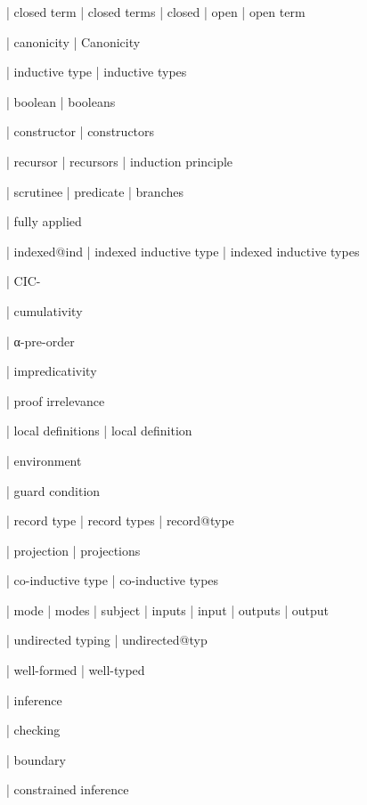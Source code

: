   | closed term
  | closed terms
  | closed
  | open
  | open term

  | canonicity
  | Canonicity

  | inductive type
  | inductive types

  | boolean
  | booleans

  | constructor
  | constructors

  | recursor
  | recursors
  | induction principle

  | scrutinee
  | predicate
  | branches

  | fully applied

  | indexed@ind
  | indexed inductive type
  | indexed inductive types

  | CIC-

  | cumulativity

  | α-pre-order

  | impredicativity

  | proof irrelevance

  | local definitions
  | local definition

  | environment

  | guard condition

  | record type
  | record types
  | record@type

  | projection
  | projections

  | co-inductive type
  | co-inductive types


  | mode
  | modes
  | subject
  | inputs
  | input
  | outputs
  | output

  | undirected typing
  | undirected@typ


  | well-formed
  | well-typed

  | inference

  | checking

  | boundary

  | constrained inference


